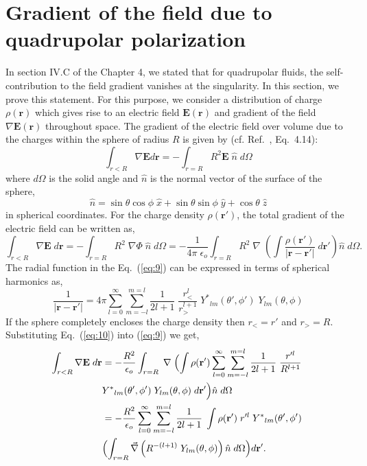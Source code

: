 \section{Gradient of the field due to quadrupolar polarization}
\label{singularQuad}
In section IV.C of the Chapter 4, we stated that for quadrupolar
fluids, the self-contribution to the field gradient vanishes at the
singularity. In this section, we prove this statement.  For this
purpose, we consider a distribution of charge $\rho(\mathbf{r})$ which
gives rise to an electric field $\mathbf{E}(\mathbf{r})$ and gradient
of the field $\nabla\mathbf{E}(\mathbf{r})$ throughout space. The
gradient of the electric field over volume due to the charges within
the sphere of radius $R$ is given by (cf. Ref.~\cite{Jackson98},
Eq.~4.14):
\begin{equation}
\int_{r<R} \nabla\mathbf{E} d\mathbf{r} = -\int_{r=R} R^2 \mathbf{E}\;\hat{n}\; d\Omega
\label{eq:8}
\end{equation}
where $d\Omega$ is the solid angle and $\hat{n}$ is the normal vector
of the surface of the sphere, 
\begin{equation}
\hat{n} = \sin\theta\cos\phi\; \hat{x} + \sin\theta\sin\phi\; \hat{y} +
\cos\theta\; \hat{z}
\end{equation}
in spherical coordinates.  For the charge density $\rho(\mathbf{r}')$, the
total gradient of the electric field can be written as,\cite{Jackson98}
\begin{equation}
\int_{r<R} {\nabla}\mathbf {E}\; d\mathbf{r}=-\int_{r=R} R^2\;
{\nabla}\Phi\; \hat{n}\; d\Omega
=-\frac{1}{4\pi\;\epsilon_o}\int_{r=R} R^2\; {\nabla}\;\left(\int
  \frac{\rho(\mathbf
    r')}{|\mathbf{r}-\mathbf{r}'|}\;d\mathbf{r}'\right) \hat{n}\;
d\Omega .
\label{eq:9}
\end{equation}
The radial function in the Eq.~(\ref{eq:9}) can be expressed in
terms of spherical harmonics as,\cite{Jackson98}
\begin{equation}
\frac{1}{|\mathbf{r} - \mathbf{r}'|} = 4\pi \sum_{l=0}^{\infty}\sum_{m=-l}^{m=l}\frac{1}{2l+1}\;\frac{{r^l_<}}{{r^{l+1}_>}}\;{Y^*}_{lm}(\theta', \phi')\;Y_{lm}(\theta, \phi)
\label{eq:10}
\end{equation}
If the sphere completely encloses the charge density then $ r_< = r'$ and $r_> = R$. Substituting Eq.~(\ref{eq:10}) into (\ref{eq:9}) we get,
\begin{align}
\int_{r<R} {\nabla}\mathbf{E}\;d\mathbf{r} &=-\frac{R^2}{\epsilon_o}\int_{r=R} \; {\nabla}\;\Bigl(\int \rho(\mathbf r')\sum_{l=0}^{\infty}\sum_{m=-l}^{m=l}\frac{1}{2l+1}\;\frac{{r'^l}}{{R^{l+1}}}\;  \nonumber \\
&  {Y^*}_{lm}(\theta', \phi')\;Y_{lm}(\theta, \phi)\;d\mathbf{r}'\Bigr) \hat{n}\; d\Omega \nonumber \\
 &= -\frac{R^2}{\epsilon_o}\sum_{l=0}^{\infty}\sum_{m=-l}^{m=l}\frac{1}{2l+1}\;\int \rho(\mathbf r')\;{r'^l}\;{Y^*}_{lm}(\theta', \phi') \nonumber \\
 &\Bigl(\int_{r=R}\vec{\nabla}\left({R^{-(l+1)}}\;Y_{lm}(\theta, \phi)\right)\hat{n}\; d\Omega \Bigr)d\mathbf{r}
' .
\label{eq:11}
\end{align} 

